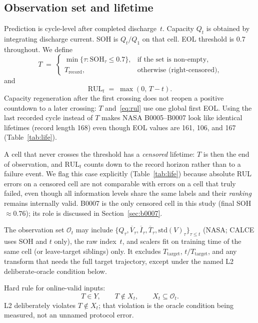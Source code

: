 \documentclass[preprint,12pt]{elsarticle}
\begin{document}
\subsection{Observation set and lifetime}
\label{sec:Ot}

Prediction is cycle-level after completed discharge~$t$.
Capacity $Q_t$ is obtained by integrating discharge current.
SOH is $Q_t/Q_1$ on that cell.
EOL threshold is 0.7 throughout.
We define
\begin{equation}
T \;=\;
\begin{cases}
\min\{ \tau: \mathrm{SOH}_\tau \le 0.7\}, & \text{if the set is non-empty},\\
T_{\mathrm{record}}, & \text{otherwise (right-censored)},
\end{cases}
\end{equation}
and
\begin{equation}
\label{eq:rul}
\mathrm{RUL}_t \;=\; \max(0,\, T-t).
\end{equation}
Capacity regeneration after the first crossing does not reopen a positive countdown to a later crossing: $T$ and~\eqref{eq:rul} use one global first EOL.
Using the last recorded cycle instead of $T$ makes NASA B0005--B0007 look like identical lifetimes (record length 168) even though EOL values are 161, 106, and 167 (Table~\ref{tab:life}).

A cell that never crosses the threshold has a \emph{censored} lifetime: $T$ is then the end of observation, and $\mathrm{RUL}_t$ counts down to the record horizon rather than to a failure event.
We flag this case explicitly (Table~\ref{tab:life}) because absolute RUL errors on a censored cell are not comparable with errors on a cell that truly failed, even though all information levels share the same labels and their \emph{ranking} remains internally valid.
B0007 is the only censored cell in this study (final SOH $\approx 0.76$); its role is discussed in Section~\ref{sec:b0007}.

The observation set $\mathcal{O}_t$ may include
$\{Q_\tau,\overline{V}_\tau,\overline{I}_\tau,\overline{T}_\tau,\mathrm{std}(V)_\tau\}_{\tau\le t}$
(NASA; CALCE uses SOH and $t$ only),
the raw index~$t$,
and scalers fit on training time of the same cell (or leave-target siblings) only.
It excludes $T_{\mathrm{target}}$, $t/T_{\mathrm{target}}$, and any transform that needs the full target trajectory, except under the named L2 deliberate-oracle condition below.

Hard rule for online-valid inputs:
\begin{equation}
\boxed{T\in Y,\qquad T\notin X_t,\qquad X_t\subseteq\mathcal{O}_t.}
\end{equation}
L2 deliberately violates $T\notin X_t$; that violation is the oracle condition being measured, not an unnamed protocol error.
\end{document}

